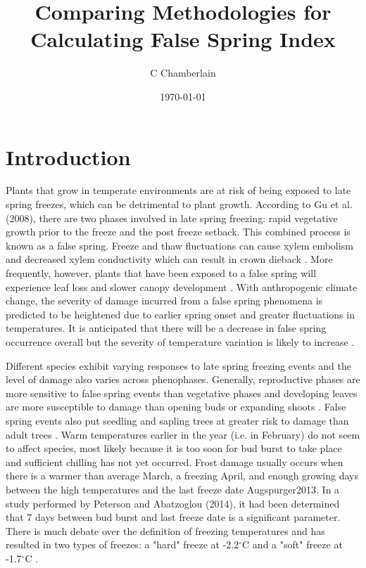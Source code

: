 \documentclass{article}\usepackage[]{graphicx}\usepackage[]{color}
\begin{document}
\title{Comparing Methodologies for Calculating False Spring Index}
\author{C Chamberlain}
\date{\today}
\maketitle 

\renewcommand{\thetable}{\arabic{table}}
\renewcommand{\thefigure}{\arabic{figure}}
\renewcommand{\labelitemi}{$-$}
\section*{Introduction}

Plants that grow in temperate environments are at risk of being exposed to late spring freezes, which can be detrimental to plant growth. According to Gu et al. (2008), there are two phases involved in late spring freezing: rapid vegetative growth prior to the freeze and the post freeze setback. This combined process is known as a false spring. Freeze and thaw fluctuations can cause xylem embolism and decreased xylem conductivity which can result in crown dieback \cite{Gu2008}. More frequently, however, plants that have been exposed to a false spring will experience leaf loss and slower canopy development \cite{Hufkens2012}. With anthropogenic climate change, the severity of damage incurred from a false spring phenomena is predicted to be heightened due to earlier spring onset and greater fluctuations in temperatures. It is anticipated that there will be a decrease in false spring occurrence overall but the severity of temperature variation is likely to increase \cite{Allstadt2015}. 

Different species exhibit varying responses to late spring freezing events and the level of damage also varies across phenophases. Generally, reproductive phases are more sensitive to false spring events than vegetative phases and developing leaves are more susceptible to damage than opening buds or expanding shoots \cite{Peterson2014}. False spring events also put seedling and sapling trees at greater risk to damage than adult trees \cite{Vitasse2014}. Warm temperatures earlier in the year (i.e. in February) do not seem to affect species, most likely because it is too soon for bud burst to take place and sufficient chilling has not yet occurred. Frost damage usually occurs when there is a warmer than average March, a freezing April, and enough growing days between the high temperatures and the last freeze date {Augspurger2013}. In a study performed by Peterson and Abatzoglou (2014), it had been determined that 7 days between bud burst and last freeze date is a significant parameter. There is much debate over the definition of freezing temperatures and has resulted in two types of freezes: a "hard" freeze at -2.2$^{\circ}$C and a "soft" freeze at -1.7$^{\circ}$C \cite{Augspurger2013, Kodra2011, Vavrus2006}.
\end{document}
